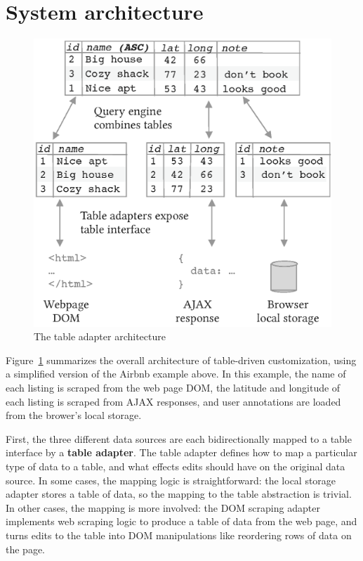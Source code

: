 \documentclass[sigplan,10pt,anonymous,review]{acmart}
\begin{document}
\hypertarget{sec:architecture}{%
\section{System architecture}\label{sec:architecture}}

\begin{figure}
\hypertarget{fig:table-adapter}{%
\centering
\includegraphics[width=\columnwidth]{media/table-adapter.eps}
\caption{The table adapter architecture}\label{fig:table-adapter}
}
\end{figure}

Figure~\ref{fig:table-adapter} summarizes the overall architecture of
table-driven customization, using a simplified version of the Airbnb
example above. In this example, the name of each listing is scraped from
the web page DOM, the latitude and longitude of each listing is scraped
from AJAX responses, and user annotations are loaded from the brower's
local storage.

First, the three different data sources are each bidirectionally mapped
to a table interface by a \textbf{table adapter}. The table adapter
defines how to map a particular type of data to a table, and what
effects edits should have on the original data source. In some cases,
the mapping logic is straightforward: the local storage adapter stores a
table of data, so the mapping to the table abstraction is trivial. In
other cases, the mapping is more involved: the DOM scraping adapter
implements web scraping logic to produce a table of data from the web
page, and turns edits to the table into DOM manipulations like
reordering rows of data on the page.
\end{document}
